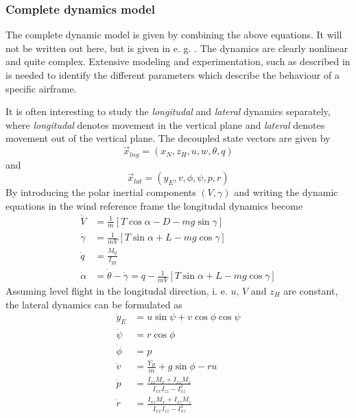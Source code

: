 \subsubsection{Complete dynamics model}
The complete dynamic model is given by combining the above equations. It will not be 
written out here, but is given in e. g. \cite{uav_dynamics_wind}. The dynamics are clearly nonlinear and quite complex. Extensive modeling and experimentation, such as described in \cite{aerodynamic_parameters}
is needed to identify the different parameters which describe the behaviour of a specific airframe.

It is often interesting to study the \textit{longitudal} and \textit{lateral} dynamics
separately, where \textit{longitudal} denotes movement in the vertical plane and
\textit{lateral} denotes movement out of the vertical plane. The decoupled state
vectors are given by
\begin{equation}
    \vec{x}_{lng}=(x_N, z_H, u, w, \theta, q)
\end{equation}
and
\begin{equation}
    \vec{x}_{lat}=(y_E, v, \phi, \psi, p, r)
\end{equation}
By introducing the polar inertial components $(V, \gamma)$ and writing the dynamic equations
in the wind reference frame the longitudal dynamics become
\begin{align}
    \dot{V}&=\frac{1}{m}[T\cos\alpha-D-mg\sin\gamma] \\
    \dot{\gamma}&=\frac{1}{mV}[T\sin\alpha + L - mg\cos\gamma] \\
    \dot{q}&=\frac{M_y}{I_{yy}} \\
    \dot{\alpha}&=\dot{\theta}-\dot{\gamma}=q-\frac{1}{mV}[T\sin\alpha + L - mg\cos\gamma]
\end{align}
Assuming level flight in the longitudal direction, i. e. $u$, $V$ and $z_H$ are constant, the lateral dynamics can be formulated as
\begin{align}
    \dot{y}_E &= u\sin\psi + v\cos\phi\cos\psi \\
    \dot{\psi} &= r\cos\phi \\
    \dot{\phi} &= p \\
    \dot{v} &= \frac{Y_B}{m} + g\sin\phi - ru \\
    \dot{p} &= \frac{I_{zz}M_x + I_{xz}M_z}{I_{xx}I_{zz} - I^2_{xz}} \\
    \dot{r} &= \frac{I_{xz}M_x + I_{xz}M_z}{I_{xx}I_{zz} - I^2_{xz}} \\
\end{align}